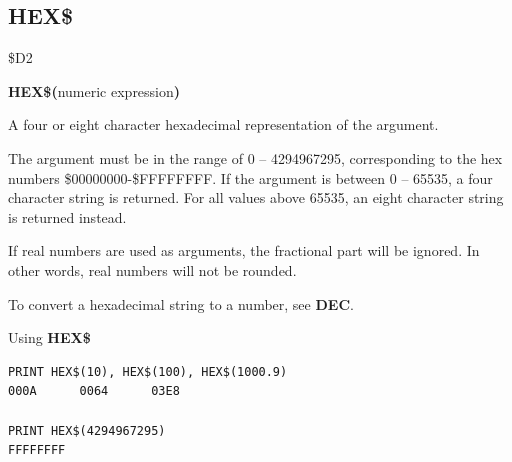 \subsection{HEX\$}
\begin{description}[leftmargin=2cm,style=nextline]
\item [Token:]    \$D2

\item [Format:]   {\bf HEX\$(}numeric expression{\bf)}

\item [Returns:]  A four or eight character hexadecimal representation of the argument.

                  The argument must be in the range of 0 -- 4294967295, corresponding to the hex numbers \$00000000-\$FFFFFFFF. If the argument is between 0 -- 65535, a four character string is returned. For all values above 65535, an eight character string is returned instead.

\item [Remarks:]  If real numbers are used as arguments, the fractional part will be ignored. In other words, real numbers will not be rounded.

                  To convert a hexadecimal string to a number, see {\bf DEC}.

\item [Examples:] Using {\bf HEX\$}

\begin{tcolorbox}[colback=black,coltext=white]
\verbatimfont{\codefont}
\begin{verbatim}
PRINT HEX$(10), HEX$(100), HEX$(1000.9)
000A      0064      03E8

PRINT HEX$(4294967295)
FFFFFFFF
\end{verbatim}
\end{tcolorbox}
\end{description}


\newpage
